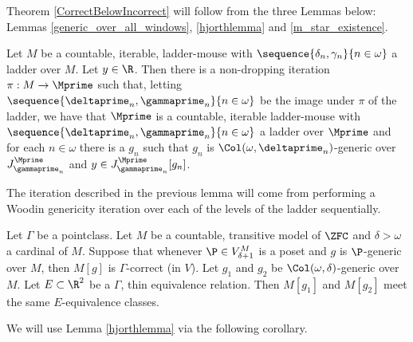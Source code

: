 \documentclass[oneside,12pt]{amsart}
\begin{document}
Theorem \ref{CorrectBelowIncorrect} will follow from the three Lemmas below:
Lemmas \ref{generic_over_all_windows}, \ref{hjorthlemma} and \ref{m_star_existence}.

\begin{lemma}
\label{generic_over_all_windows}
Let $M$ be a countable, iterable, ladder-mouse
with $\sequence{\delta_n,\gamma_n}{n\in\omega}$ a ladder over $M$.
Let $y\in\R$.
Then there is a non-dropping iteration $\pi:M\to \Mprime$ such that,
letting $\sequence{\deltaprime_n,\gammaprime_n}{n\in\omega}$ be the image under $\pi$
of the ladder, we have that $\Mprime$ is a countable, iterable ladder-mouse
with $\sequence{\deltaprime_n,\gammaprime_n}{n\in\omega}$ a ladder over $\Mprime$
and for each $n\in\omega$ there is a $g_n$ such that $g_n$
is $\Col(\omega,\deltaprime_n)$-generic over
$J^{\Mprime}_{\gammaprime_n}$ and $y\in J^{\Mprime}_{\gammaprime_n}[g_n]$.
\end{lemma}

The iteration described in the previous lemma will come from performing a
Woodin genericity iteration over each of the levels of the ladder sequentially.

\begin{lemma}
\label{hjorthlemma}
Let $\Gamma$ be a pointclass.
Let $M$ be a countable, transitive model of $\ZFC$ and  $\delta>\omega$ a cardinal of $M$.
Suppose that whenever $\P\in V^M_{\delta+1}$ is a poset and $g$ is $\P$-generic over $M$, then
$M[g]$ is $\Gamma$-correct (in $V$). Let $g_1$ and $g_2$ be $\Col(\omega, \delta)$-generic over $M$.
Let $E\subset\R^2$ be a $\Gamma$, thin equivalence relation.
Then $M[g_1]$ and $M[g_2]$ meet the same $E$-equivalence classes.
\end{lemma}

We will use Lemma \ref{hjorthlemma} via the following corollary.
\end{document}
